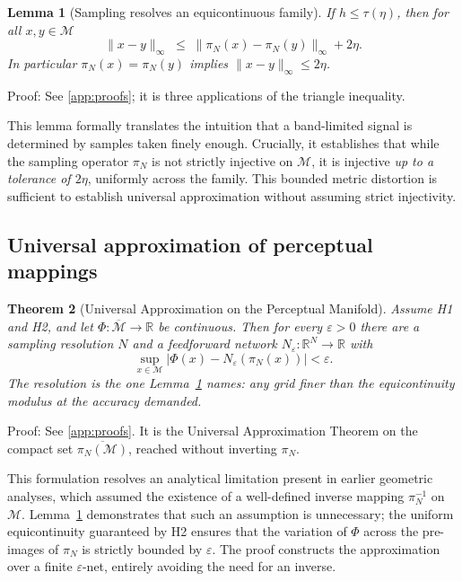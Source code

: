 \documentclass[10pt]{article}
\theoremstyle{plain}
\newtheorem{theorem}{Theorem}[section]
\newtheorem{lemma}[theorem]{Lemma}
\theoremstyle{definition}
\theoremstyle{remark}
\begin{document}
\begin{lemma}[Sampling resolves an equicontinuous family]
\label{lem:sampling}
If $h \le \tau(\eta)$, then for all $x,y \in \mathcal{M}$
\[
\|x-y\|_\infty \;\le\; \|\pi_N(x)-\pi_N(y)\|_\infty + 2\eta .
\]
In particular $\pi_N(x) = \pi_N(y)$ implies $\|x-y\|_\infty \le 2\eta$.
\end{lemma}

\noindent Proof: See \ref{app:proofs}; it is three applications of the
triangle inequality.

This lemma formally translates the intuition that a band-limited signal is determined by samples taken finely enough. Crucially, it establishes that while
the sampling operator $\pi_N$ is not strictly injective on $\mathcal{M}$, it is
injective \emph{up to a tolerance of $2\eta$}, uniformly across the family. This
bounded metric distortion is sufficient to establish universal approximation
without assuming strict injectivity.

\subsection{Universal approximation of perceptual mappings}

\begin{theorem}[Universal Approximation on the Perceptual Manifold]
\label{thm:uat}
Assume H1 and H2, and let $\Phi : \overline{\mathcal{M}} \to \mathbb{R}$ be
continuous. Then for every $\varepsilon > 0$ there are a sampling resolution
$N$ and a feedforward network $N_\varepsilon : \mathbb{R}^N \to \mathbb{R}$ with
\[
\sup_{x \in \mathcal{M}} |\Phi(x) - N_\varepsilon(\pi_N(x))| < \varepsilon .
\]
The resolution is the one Lemma~\ref{lem:sampling} names: any grid finer than
the equicontinuity modulus at the accuracy demanded.
\end{theorem}

\noindent Proof: See \ref{app:proofs}. It is the Universal Approximation
Theorem \citep{cybenko1989approximation, hornik1991approximation} on the
compact set $\overline{\pi_N(\mathcal{M})}$, reached without inverting
$\pi_N$.

This formulation resolves an analytical limitation present in earlier geometric
analyses, which assumed the existence of a well-defined inverse mapping
$\pi_N^{-1}$ on $\mathcal{M}$. Lemma~\ref{lem:sampling} demonstrates that such
an assumption is unnecessary; the uniform equicontinuity guaranteed by H2
ensures that the variation of $\Phi$ across the pre-images of $\pi_N$ is strictly
bounded by $\varepsilon$. The proof constructs the approximation over a finite
$\varepsilon$-net, entirely avoiding the need for an inverse.
\end{document}
